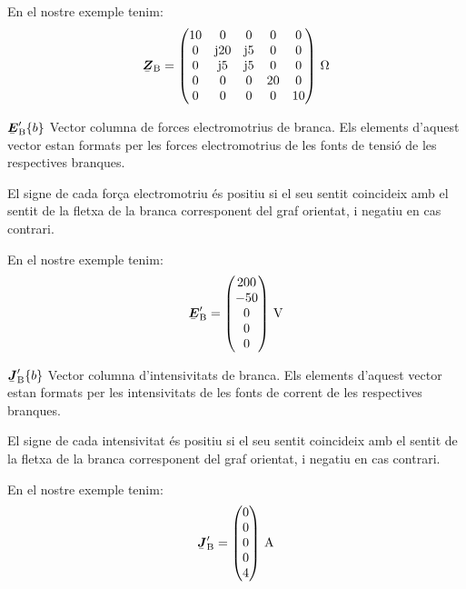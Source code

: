 \begin{list}{}
   En el nostre exemple tenim:
   \[
      \mcmplx{Z}\ped{B} = \begin{pmatrix}
            10 & 0 & 0 & 0 & 0 \\
            0 & \ju 20 & \ju 5 & 0 & 0 \\
            0 & \ju 5 & \ju 5 & 0 & 0 \\
            0 & 0 & 0 & 20 & 0 \\
            0 & 0 & 0 & 0 & 10
      \end{pmatrix}\unit{\,\ohm}
   \]

   \item[$\mcmplx{E}'\ped{B}\{b\}$] Vector columna de forces electromotrius de branca. Els elements d'aquest vector estan formats per les forces electromotrius de les fonts de tensió de les respectives branques.

El signe de cada força electromotriu és positiu si el seu sentit coincideix amb el sentit de la fletxa de la branca corresponent del graf orientat, i negatiu en cas contrari.

   En el nostre exemple tenim:
   \[
      \mcmplx{E}'\ped{B} = \begin{pmatrix} 200 \\ -50 \\ 0 \\ 0 \\ 0 \end{pmatrix}\unit{\,V}
   \]

   \item[$\mcmplx{J}'\ped{B}\{b\}$] Vector columna d'intensivitats de branca. Els elements d'aquest vector estan formats per les intensivitats de les fonts de corrent de les respectives branques.

El signe de cada intensivitat és positiu si el seu sentit coincideix amb el sentit de la fletxa de la branca corresponent del graf orientat, i negatiu en cas contrari.

   En el nostre exemple tenim:
   \[
      \mcmplx{J}'\ped{B} = \begin{pmatrix} 0 \\ 0 \\ 0 \\ 0 \\ 4 \end{pmatrix}\unit{\,A}
   \]

\end{list}

